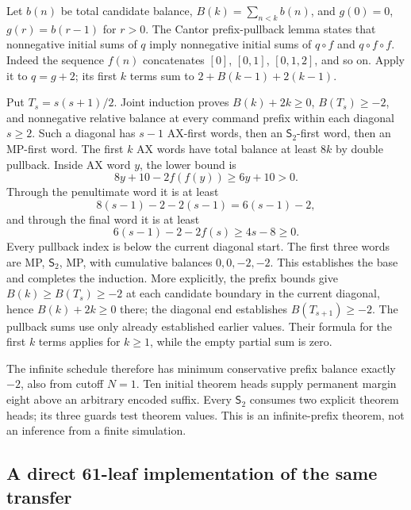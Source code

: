 Let $b(n)$ be total candidate balance, $B(k)=\sum_{n<k}b(n)$, and
$g(0)=0$, $g(r)=b(r-1)$ for $r>0$. The Cantor prefix-pullback lemma
states that nonnegative initial sums of $q$ imply nonnegative initial
sums of $q\circ f$ and $q\circ f\circ f$. Indeed the sequence $f(n)$
concatenates $[0]$, $[0,1]$, $[0,1,2]$, and so on. Apply it to $q=g+2$;
its first $k$ terms sum to $2+B(k-1)+2(k-1)$.

Put $T_s=s(s+1)/2$. Joint induction proves $B(k)+2k\geq0$,
$B(T_s)\geq-2$, and nonnegative relative balance at every command prefix
within each diagonal $s\geq2$. Such a diagonal has $s-1$ AX-first words,
then an $\mathsf S_2$-first word, then an MP-first word. The first $k$
AX words have total balance at least $8k$ by double pullback. Inside AX
word $y$, the lower bound is
\[
 8y+10-2f(f(y))\geq6y+10>0.
\]
Through the penultimate word it is at least
\[
 8(s-1)-2-2(s-1)=6(s-1)-2,
\]
and through the final word it is at least
\[
 6(s-1)-2-2f(s)\geq4s-8\geq0.
\]
Every pullback index is below the current diagonal start. The first
three words are MP, $\mathsf S_2$, MP, with cumulative balances
$0,0,-2,-2$. This establishes the base and completes the induction.
More explicitly, the prefix bounds give
$B(k)\geq B(T_s)\geq-2$ at each candidate boundary in the current
diagonal, hence $B(k)+2k\geq0$ there; the diagonal end establishes
$B(T_{s+1})\geq-2$. The pullback sums use only already established
earlier values. Their formula for the first $k$ terms applies for
$k\geq1$, while the empty partial sum is zero.

The infinite schedule therefore has minimum conservative prefix balance
exactly $-2$, also from cutoff $N=1$. Ten initial theorem heads supply
permanent margin eight above an arbitrary encoded suffix. Every
$\mathsf S_2$ consumes two explicit theorem heads; its three guards test
theorem values. This is an infinite-prefix theorem, not an inference
from a finite simulation.

\subsection{A direct 61-leaf implementation of the same transfer}

